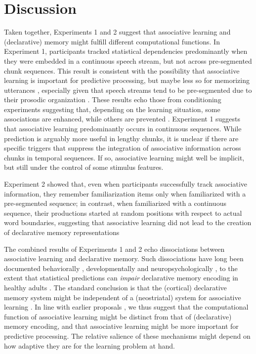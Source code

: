 \documentclass[
]{article}
\begin{document}
\clearpage

\section{Discussion}\label{discussion}

Taken together, Experiments 1 and 2 suggest that associative learning
and (declarative) memory might fulfill different computational
functions. In Experiment 1, participants tracked statistical
dependencies predominantly when they were embedded in a continuous
speech stream, but not across pre-segmented chunk sequences. This result
is consistent with the possibility that associative learning is
important for predictive processing, but maybe less so for memorizing
utterances \citep{Turk-Browne2010, Sherman2020}, especially given that
speech streams tend to be pre-segmented due to their prosodic
organization
\citep{Cutler1997, Shattuck-Hufnagel1996, Brentari2011, Endress-cross-seg, Fenlon2008, Pilon1981, Christophe2001}.
These results echo those from conditioning experiments suggesting that,
depending on the learning situation, some associations are enhanced,
while others are prevented
\citep{Alberts1984, Garcia1974, Garcia1976, Gubernick1984, Martin1979}.
Experiment 1 suggests that associative learning predominantly occurs in
continuous sequences. While prediction is arguably more useful in
lengthy chunks, it is unclear if there are specific triggers that
suppress the integration of associative information across chunks in
temporal sequences. If so, associative learning might well be implicit,
but still under the control of some stimulus features.

Experiment 2 showed that, even when participants successfully track
associative information, they remember familiarization items only when
familiarized with a pre-segmented sequence; in contrast, when
familiarized with a continuous sequence, their productions started at
random positions with respect to actual word boundaries, suggesting that
associative learning did not lead to the creation of declarative memory
representations

The combined results of Experiments 1 and 2 echo dissociations between
associative learning and declarative memory. Such dissociations have
long been documented behaviorally \citep{Graf1984}, developmentally
\citep{Finn2016} and neuropsychologically
\citep{Cohen1980, Knowlton1996a, Rungratsameetaweemana2019, Poldrack2001, Squire1992},
to the extent that statistical predictions can \emph{impair} declarative
memory encoding in healthy adults \citep{Sherman2020}. The standard
conclusion is that the (cortical) declarative memory system might be
independent of a (neostriatal) system for associative learning
\citep{Knowlton1996a, Poldrack2001, Squire1992}. In line with earlier
proposals \citep{Goujon2015, Turk-Browne2010, Sherman2020}, we thus
suggest that the computational function of associative learning might be
distinct from that of (declarative) memory encoding, and that
associative learning might be more important for predictive processing.
The relative salience of these mechanisms might depend on how adaptive
they are for the learning problem at hand.
\end{document}
